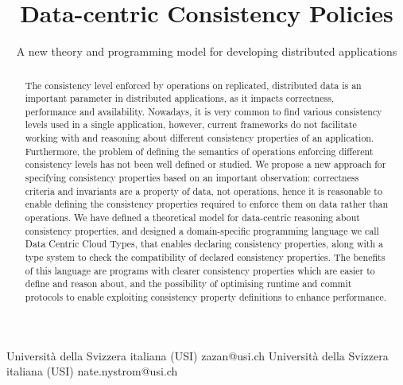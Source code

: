 \documentclass[preprint, numbers]{sigplanconf}
\begin{document}
\setlength{\pdfpageheight}{\paperheight}
\setlength{\pdfpagewidth}{\paperwidth}




\title{Data-centric Consistency Policies}
\subtitle{A new theory and programming model for developing
  distributed applications}

           {Universit\`a della Svizzera italiana (USI)}
           {zazan@usi.ch}
           {Universit\`a della Svizzera italiana (USI)}
           {nate.nystrom@usi.ch}

\maketitle

\begin{abstract}
The consistency level enforced by operations on replicated, distributed data is 
an important parameter in distributed applications, as it impacts correctness, 
performance and availability. Nowadays, it is very common to find various consistency
levels used in a single application, however, current frameworks do not facilitate
working with and reasoning about different consistency properties of an application. 
Furthermore, the problem of defining the semantics of operations enforcing different 
consistency levels has not been well defined or studied. We propose a new
approach for specifying consistency properties based on an important observation: 
correctness criteria and invariants are a property of data, not operations, hence it is 
reasonable to enable defining the consistency properties required to enforce them on data 
rather than operations. We have defined a theoretical model for data-centric reasoning about consistency
properties, and designed a domain-specific programming language we call Data Centric Cloud Types, that enables 
declaring consistency properties, along with a type system to check the compatibility of declared consistency 
properties. The benefits of this language are programs with clearer consistency properties which are 
easier to define and reason about, and the possibility of optimising runtime and commit protocols to enable 
exploiting consistency property definitions to enhance performance.
\end{abstract}
\end{document}
